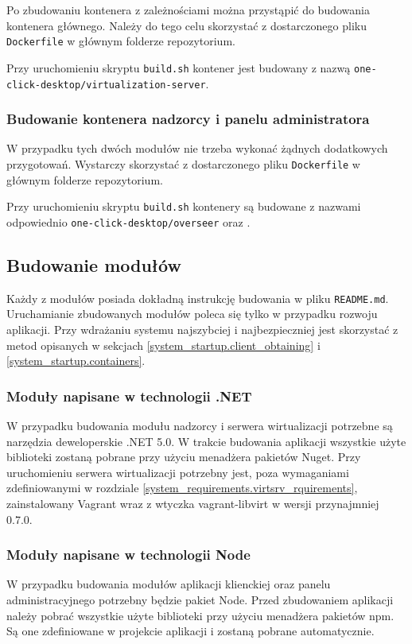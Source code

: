 \documentclass[../opis-rozwiazania.tex]{subfiles}
\begin{document}
Po zbudowaniu kontenera z zależnościami można przystąpić do budowania kontenera głównego.
Należy do tego celu skorzystać z dostarczonego pliku \texttt{Dockerfile} w głównym folderze repozytorium.

Przy uruchomieniu skryptu \texttt{build.sh} kontener jest budowany z nazwą \texttt{one-click-desktop/virtualization-server}.

\subsubsection{Budowanie kontenera nadzorcy i panelu administratora}
W przypadku tych dwóch modułów nie trzeba wykonać żądnych dodatkowych przygotowań.
Wystarczy skorzystać z dostarczonego pliku \texttt{Dockerfile} w głównym folderze repozytorium.

Przy uruchomieniu skryptu \texttt{build.sh} kontenery są budowane z nazwami odpowiednio \texttt{one-click-desktop/overseer} oraz \texttt{}.

\subsection{Budowanie modułów}
Każdy z modułów posiada dokładną instrukcję budowania w pliku \texttt{README.md}.
Uruchamianie zbudowanych modułów poleca się tylko w przypadku rozwoju aplikacji.
Przy wdrażaniu systemu najszybciej i najbezpieczniej jest skorzystać z metod opisanych w sekcjach \ref{system_startup.client_obtaining} i \ref{system_startup.containers}.

\subsubsection{Moduły napisane w technologii .NET}
W przypadku budowania modułu nadzorcy i serwera wirtualizacji potrzebne są narzędzia deweloperskie .NET 5.0.
W trakcie budowania aplikacji wszystkie użyte biblioteki zostaną pobrane przy użyciu menadżera pakietów Nuget.
Przy uruchomieniu serwera wirtualizacji potrzebny jest, poza wymaganiami zdefiniowanymi w rozdziale \ref{system_requirements.virtsrv_rquirements}, zainstalowany Vagrant wraz z wtyczka vagrant-libvirt w wersji przynajmniej 0.7.0.

\subsubsection{Moduły napisane w technologii Node}
W przypadku budowania modułów aplikacji klienckiej oraz panelu administracyjnego potrzebny będzie pakiet Node. Przed zbudowaniem aplikacji należy pobrać wszystkie użyte biblioteki przy użyciu menadżera pakietów npm.
Są one zdefiniowane w projekcie aplikacji i zostaną pobrane automatycznie.
\end{document}
